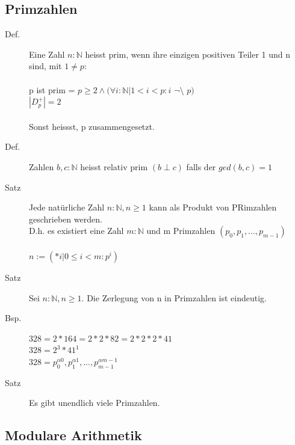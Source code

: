 \documentclass[a4paper,10pt]{article}
\newcommand{\NN}{\mathbb{N}} %
\begin{document}
\subsection{Primzahlen}
\begin{description}
	\item[Def.] Eine Zahl $n:\NN$ heisst prim, wenn ihre einzigen positiven Teiler 		1 und n sind, mit $1 \neq p$: \\ \\
		p ist prim = $p \geq 2 \wedge ( \forall i:\NN | 1 < i < p : i$ $\neg\setminus$ $p)$ \\
		$|D_p^+|=2$ \\ \\
		Sonst heissst, p zusammengesetzt.
	\item[Def.] Zahlen $b,c:\NN$ heisst relativ prim $(b \perp c)$ falls der $ged(b,c)=1$
	\item[Satz] Jede nat\"urliche Zahl $n:\NN, n \geq 1$ kann als Produkt von PRimzahlen geschrieben werden. \\
		D.h. es existiert eine Zahl $m:\NN$ und m Primzahlen $(p_0,p_1, ...,p_{m-1})$ \\ \\
		$n:=(*i|0 \leq i < m : p^i)$
	\item[Satz] Sei $n:\NN, n \geq 1$. Die Zerlegung von n in Primzahlen ist eindeutig.
	\item[Bsp.] $328 = 2 * 164 = 2 * 2 * 82 = 2 * 2 * 2 * 41$ \\
		$328=2^3*41^1$ \\
		$328=p_0^{\alpha 0},p_1^{\alpha 1}, ..., p_{m-1}^{\alpha m-1}$
	\item[Satz] Es gibt unendlich viele Primzahlen.
\end{description}

\subsection{Modulare Arithmetik}
\end{document}
